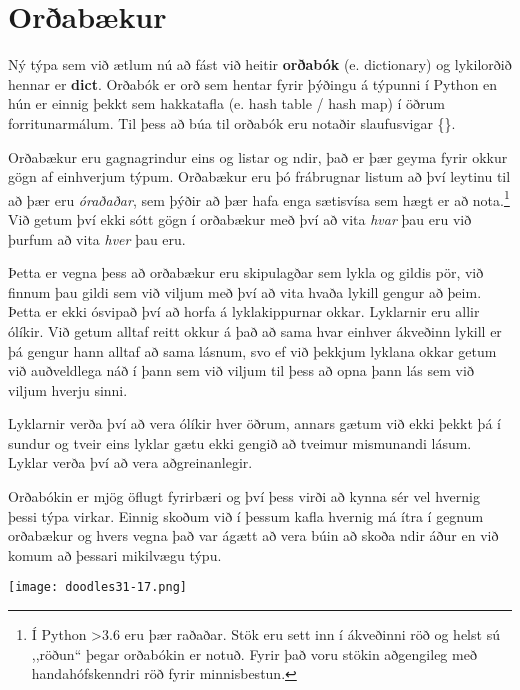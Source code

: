 
\chapter{Orðabækur}\label{k:orðabækur}
Ný týpa sem við ætlum nú að fást við heitir \textbf{orðabók} (e. dictionary)  og lykilorðið hennar er \textbf{dict}.
Orðabók er orð sem hentar fyrir þýðingu á týpunni í Python en hún er einnig þekkt sem hakkatafla (e. hash table / hash map) í öðrum forritunarmálum.
Til þess að búa til orðabók eru notaðir slaufusvigar \{\}.

Orðabækur eru gagnagrindur eins og listar og ndir, það er þær geyma fyrir okkur gögn af einhverjum týpum.
Orðabækur eru þó frábrugnar listum að því leytinu til að þær eru \textit{óraðaðar}, sem þýðir að þær hafa enga sætisvísa sem hægt er að nota.\footnote{Í Python >3.6 eru þær raðaðar.
Stök eru sett inn í ákveðinni röð og helst sú ,,röðun“ þegar orðabókin er notuð.
Fyrir það voru stökin aðgengileg með handahófskenndri röð fyrir minnisbestun.}
Við getum því ekki sótt gögn í orðabækur með því að vita \textit{hvar} þau eru við þurfum að vita \textit{hver} þau eru.

Þetta er vegna þess að orðabækur eru skipulagðar sem lykla og gildis pör, við finnum þau gildi sem við viljum með því að vita hvaða lykill gengur að þeim.
Þetta er ekki ósvipað því að horfa á lyklakippurnar okkar.
Lyklarnir eru allir ólíkir.
Við getum alltaf reitt okkur á það að sama hvar einhver ákveðinn lykill er þá gengur hann alltaf að sama lásnum, svo ef við þekkjum lyklana okkar getum við auðveldlega náð í þann sem við viljum til þess að opna þann lás sem við viljum hverju sinni.

Lyklarnir verða því að vera ólíkir hver öðrum, annars gætum við ekki þekkt þá í sundur og tveir eins lyklar gætu ekki gengið að tveimur mismunandi lásum.
Lyklar verða því að vera aðgreinanlegir.

Orðabókin er mjög öflugt fyrirbæri og því þess virði að kynna sér vel hvernig þessi týpa virkar.
Einnig skoðum við í þessum kafla hvernig má ítra í gegnum orðabækur og hvers vegna það var ágætt að vera búin að skoða ndir áður en við komum að þessari mikilvægu týpu.

	\begin{center}
		\texttt{[image: doodles31-17.png]}
	\end{center}
